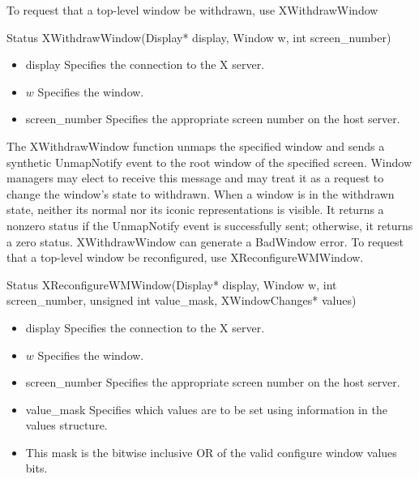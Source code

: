 \documentclass{report}
\begin{document}
\begin{itemize}
\begin{itemize}
            \bigbreak \noindent 
            To request that a top-level window be withdrawn, use XWithdrawWindow
            \bigbreak \noindent 
            \begin{cppcode}
            Status XWithdrawWindow(Display* display, Window w, int screen_number)
            \end{cppcode}
            \bigbreak \noindent
            \begin{itemize}
                \item display Specifies the connection to the X server.
                \item $w$ Specifies the window.
                \item screen\_number Specifies the appropriate screen number on the host server.
            \end{itemize}
            The XWithdrawWindow function unmaps the specified window and sends a synthetic UnmapNotify event to the root window of the specified screen. Window managers may elect to receive this message and may treat it as a request to change the window’s state to withdrawn. When a window is in the withdrawn state, neither its normal nor its iconic representations is visible. It returns a nonzero status if the UnmapNotify event is successfully sent; otherwise, it returns a zero status.
            \bigbreak \noindent 
            XWithdrawWindow can generate a BadWindow error.
            \bigbreak \noindent 
            To request that a top-level window be reconfigured, use XReconfigureWMWindow.
            \bigbreak \noindent 
            \begin{cppcode}
            Status XReconfigureWMWindow(Display* display, Window w, int screen_number, unsigned int value_mask, XWindowChanges* values)
            \end{cppcode}
            \bigbreak \noindent
            \begin{itemize}
                \item display Specifies the connection to the X server.
                \item $w$ Specifies the window.
                \item screen\_number Specifies the appropriate screen number on the host server.
                \item value\_mask Specifies which values are to be set using information in the values structure.
                \item This mask is the bitwise inclusive OR of the valid configure window values bits.

\end{itemize}
\end{itemize}
\end{itemize}
\end{document}
